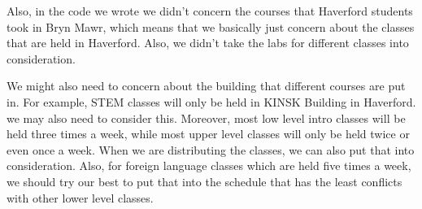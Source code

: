 \documentclass[11pt, oneside]{article}   	%
\begin{document}
Also, in the code we wrote we didn't concern the courses that Haverford students took in Bryn Mawr, which means that we basically just concern about the classes that are held in Haverford. Also, we didn't take the labs for different classes into consideration.

We might also need to concern about the building that different courses are put in. For example, STEM classes will only be held in KINSK Building in Haverford. we may also need to consider this. Moreover, most low level intro classes will be held three times a week, while most upper level classes will only be held twice or even once a week. When we are distributing the classes, we can also put that into consideration. Also, for foreign language classes which are held five times a week, we should try our best to put that into the schedule that has the least conflicts with other lower level classes. 
\end{document}
